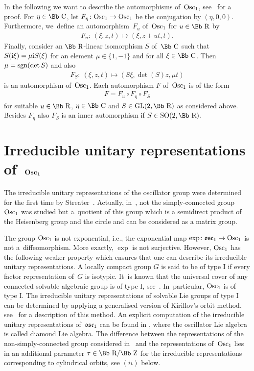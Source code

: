 \documentclass[pdftex]{sigma}
\newcommand\CC{{\mbox{\Bb C}}}
\newcommand\RR{{\mbox{\Bb R}}}
\newcommand\ZZ{{\mbox{\Bb Z}}}
\newcommand\osc{\frak o \frak s \frak c}
\newcommand{\GL}{\mathop{{\rm GL}}}
\newcommand{\SO}{\mathop{{\rm SO}}}
\newcommand{\Osc}{{\rm Osc}}
\newcommand{\sgn}{\mathop{{\rm sgn}}}
\numberwithin{equation}{section}
\begin{document}
In the following we want to describe the automorphisms of~$\Osc_1$, see~\cite{F} for a proof.
For $\eta\in\CC$, let $F_\eta\colon \Osc_1\rightarrow \Osc_1$ be the conjugation by $(\eta,0,0)$. Furthermore, we~define an automorphism~$F_u$ of~$\Osc_1$ for $u\in\RR$ by
\begin{gather}\label{EFu}
F_u\colon \ (\xi, z, t)\longmapsto (\xi,z+ut,t).
\end{gather}
Finally, consider an $\RR$-linear isomorphism $S$ of~$\CC$ such that $S({\rm i}\xi)=\mu {\rm i}S(\xi)$ for an element $\mu\in\{1,-1\}$ and for all $\xi\in\CC$. Then
$\mu=\sgn(\det S)$ and also
\begin{gather}\label{ES}
F_{S}\colon \ (\xi,z,t)\longmapsto (S\xi,\det(S) z,\mu t)
\end{gather}
is an automorphism of~$\Osc_1$. Each automorphism $F$ of~$\Osc_1$ is of the form
\begin{gather*}
F=F_u\circ F_{\eta}\circ F_{S}
\end{gather*}
for suitable $u\in\RR$, $\eta\in \CC$ and $S\in\GL(2,\RR)$ as considered above. Besides $F_\eta$ also $F_S$ is an inner automorphism if $S\in\SO(2,\RR)$.
%
\section[Irreducible unitary representations of~$\Osc_1$]
{Irreducible unitary representations of~$\boldsymbol{\Osc_1}$} \label{irrrep}

The irreducible unitary representations of the oscillator group were determined for the first time by Streater~\cite{St67}. Actually, in~\cite{St67}, not the simply-connected group $\Osc_1$ was studied but a~quotient of this group which is a semidirect product of the Heisenberg group and the circle and can be considered as a matrix group.

The group $\Osc_1$ is not exponential, i.e., the exponential map $\exp\colon \osc_1\to\Osc_1$ is not a~dif\-feo\-morphism. More exactly, $\exp$ is not surjective. However, $\Osc_1$
has the following weaker property which ensures that one can describe its irreducible unitary representations.
A locally compact group $G$ is said to be of type I if every factor representation of~$G$ is isotypic. It~is known that the universal cover of any connected solvable algebraic group is of type I, see~\cite[p.~440]{Pu69}. In~particular, $\Osc_1$ is of type I. The irreducible unitary representations of solvable Lie groups of type I can be determined by applying a generalised version of Kirillov's orbit method, see~\cite{AK71,Ki99,Ki04} for a description of this method. An explicit computation of the irreducible unitary representations of~$\osc_1$ can be found in \cite[Section~4.3]{Ki04}, where the oscillator Lie algebra is called diamond Lie algebra.
The difference between the representations of the non-simply-connected group considered in~\cite{St67} and the representations of~$\Osc_1$ lies in an additional parameter $\tau\in\RR/\ZZ$ for the irreducible representations corresponding to cylindrical orbits, see $(ii)$ below.
\end{document}

